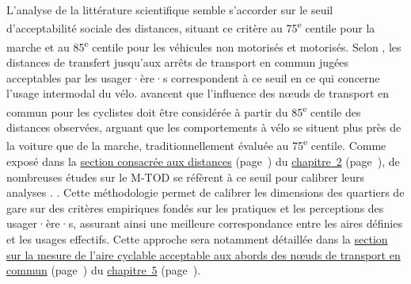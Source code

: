 \begin{refsegment}
{    L'analyse de la littérature scientifique semble s'accorder sur le seuil d'acceptabilité sociale des distances, situant ce critère au 75\textsuperscript{e} centile pour la marche et au 85\textsuperscript{e} centile pour les véhicules non motorisés et motorisés. Selon \textcolor{blue}{\textcite[5]{zuo_determining_2018}}, les distances de transfert jusqu'aux arrêts de transport en commun jugées acceptables par les usager·ère·s correspondent à ce seuil en ce qui concerne l'usage intermodal du vélo. \textcolor{blue}{\textcite[982]{lee_bicycle-based_2016}} avancent que l'influence des nœuds de transport en commun pour les cyclistes doit être considérée à partir du 85\textsuperscript{e} centile des distances observées, arguant que les comportements à vélo se situent plus près de la voiture que de la marche, traditionnellement évaluée au 75\textsuperscript{e} centile. Comme exposé dans la \hyperref[chap2:distances-premiers-derniers-km]{section consacrée aux distances} (page~\pageref{chap2:distances-premiers-derniers-km}) du \hyperref[chap2:titre]{chapitre~2} (page~\pageref{chap2:titre}), de nombreuses études sur le \acrshort{M-TOD} se réfèrent à ce seuil pour calibrer leurs analyses \textcolor{blue}{\autocites[4]{hu_examining_2022}[3~491]{li_exploring_2017}[64]{ma_understanding_2018}[62]{rabaud_quand_2022}}.
}. Cette méthodologie permet de calibrer les dimensions des quartiers de gare sur des critères empiriques fondés sur les pratiques et les perceptions des usager·ère·s, assurant ainsi une meilleure correspondance entre les aires définies et les usages effectifs. Cette approche sera notamment détaillée dans la \hyperref[chap5:aire-cyclable-micromobilite]{section sur la mesure de l'aire cyclable acceptable aux abords des nœuds de transport en commun} (page~\pageref{chap5:aire-cyclable-micromobilite}) du \hyperref[chap5:titre]{chapitre~5} (page~\pageref{chap5:titre}).%


\end{refsegment}
